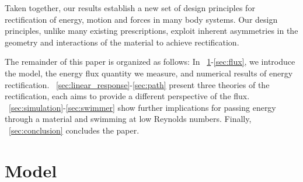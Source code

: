 \documentclass[
 preprint,
 preprintnumbers,
 amsmath,amssymb,
 aps,
 pre,
 longbibliography,
 10pt, twocolumn
]{revtex4-1}
\begin{document}
Taken together, our results establish a new set of design principles for rectification of energy, motion and forces in many body systems. Our design principles, unlike many existing prescriptions, exploit inherent asymmetries in the geometry and interactions of the material to achieve rectification. 



The remainder of this paper is organized as follows:
In \secname~\ref{sec:model}-\ref{sec:flux}, we introduce the model, the energy flux quantity we measure, and numerical results of energy rectification.
\secname~\ref{sec:linear_response}-\ref{sec:path} present three theories of the rectification, each aims to provide a different perspective of the flux.
\secname~\ref{sec:simulation}-\ref{sec:swimmer} show further implications for passing energy through a material and swimming at low Reynolds numbers. 
Finally, \secname~\ref{sec:conclusion} concludes the paper.


\section{Model} \label{sec:model}
\end{document}
